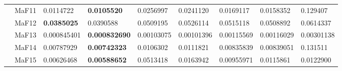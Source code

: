 \documentclass[]{article}
\begin{document}
\begin{landscape}
\begin{table}
\begin{footnotesize}
\begin{tabular}{|l|l|l|l|l|l|l|l|l|}
 & MaF11 & \cellcolor{gray95} 0.0114722 & \cellcolor{gray95} {\bf 0.0105520} & 0.0256997 & 0.0241120 & 0.0169117 & \cellcolor{gray95} 0.0158352 & 0.129407\\
 & MaF12 & \cellcolor{gray95} {\bf 0.0385025} & \cellcolor{gray95} 0.0390588 & 0.0509195 & 0.0526114 & 0.0515118 & 0.0508892 & 0.0614337\\
 & MaF13 & \cellcolor{gray95} 0.000845401 & \cellcolor{gray95} {\bf 0.000832690} & 0.00103075 & \cellcolor{gray95} 0.00101396 & 0.00115569 & 0.00116029 & 0.00301138\\
 & MaF14 & \cellcolor{gray95} 0.00787929 & \cellcolor{gray95} {\bf 0.00742323} & 0.0106302 & 0.0111821 & \cellcolor{gray95} 0.00835839 & \cellcolor{gray95} 0.00839051 & 0.131511\\
 & MaF15 & \cellcolor{gray95} 0.00626468 & \cellcolor{gray95} {\bf 0.00588652} & 0.0513418 & 0.0163942 & 0.00955971 & 0.0115861 & 0.0122900\\
\hline


\end{tabular}
\end{footnotesize}
\end{table}
\end{landscape}
\end{document}
